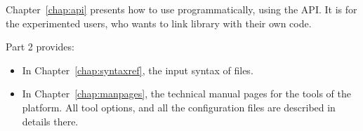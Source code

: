 
Chapter~\ref{chap:api} presents how to use \why programmatically,
using the API.  It is for the experimented users, who wants to link
\why library with their own code.

Part 2 provides: 
\begin{itemize}
\item In Chapter~\ref{chap:syntaxref}, the input syntax of files.
\item In Chapter~\ref{chap:manpages}, the technical manual pages for the
  tools of the platform. All tool options, and all the configuration
  files are described in details there.
\end{itemize}


